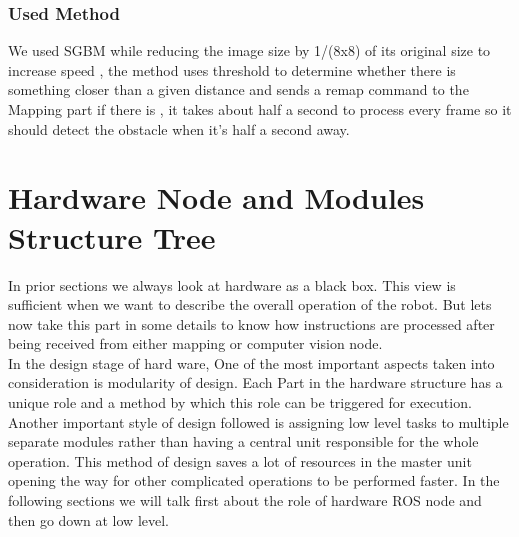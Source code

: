 \documentclass[12pt]{article}
\begin{document}
\subsubsection{Used Method}
We used SGBM while reducing the image size by 1/(8x8) of its original size to increase speed , the method uses threshold to determine whether there is something closer than a given distance and sends a remap command to the Mapping part if there is , it takes about half a second to process every frame so it should detect the obstacle when it’s half a second away.

\newpage

\section{Hardware Node and Modules Structure Tree}
In prior sections we always look at hardware as a black box. This view is sufficient when we want to describe the overall operation of the robot. But lets now take this part in some details to know how instructions are processed after being received from either mapping or computer vision node. \\
In the design stage of hard ware, One of the most important aspects taken into consideration is modularity of design. Each Part in the hardware structure has a unique role and a method by which this role can be triggered for execution. Another important style of design followed is assigning low level tasks to multiple separate modules rather than having a central unit responsible for the whole operation. This method of design saves a lot of resources in the master unit opening the way for other complicated operations to be performed faster. In the following sections we will talk first about the role of hardware ROS node and then go down at low level.
\end{document}
